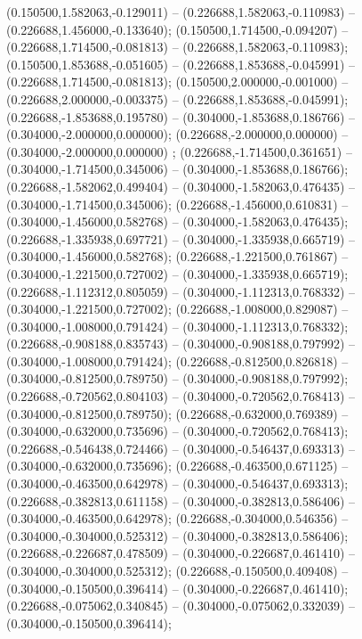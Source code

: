  (0.150500,1.582063,-0.129011) -- (0.226688,1.582063,-0.110983) -- (0.226688,1.456000,-0.133640);
 (0.150500,1.714500,-0.094207) -- (0.226688,1.714500,-0.081813) -- (0.226688,1.582063,-0.110983);
 (0.150500,1.853688,-0.051605) -- (0.226688,1.853688,-0.045991) -- (0.226688,1.714500,-0.081813);
 (0.150500,2.000000,-0.001000) -- (0.226688,2.000000,-0.003375) -- (0.226688,1.853688,-0.045991);
 (0.226688,-1.853688,0.195780) -- (0.304000,-1.853688,0.186766) -- (0.304000,-2.000000,0.000000);
 (0.226688,-2.000000,0.000000) -- (0.304000,-2.000000,0.000000) ;
 (0.226688,-1.714500,0.361651) -- (0.304000,-1.714500,0.345006) -- (0.304000,-1.853688,0.186766);
 (0.226688,-1.582062,0.499404) -- (0.304000,-1.582063,0.476435) -- (0.304000,-1.714500,0.345006);
 (0.226688,-1.456000,0.610831) -- (0.304000,-1.456000,0.582768) -- (0.304000,-1.582063,0.476435);
 (0.226688,-1.335938,0.697721) -- (0.304000,-1.335938,0.665719) -- (0.304000,-1.456000,0.582768);
 (0.226688,-1.221500,0.761867) -- (0.304000,-1.221500,0.727002) -- (0.304000,-1.335938,0.665719);
 (0.226688,-1.112312,0.805059) -- (0.304000,-1.112313,0.768332) -- (0.304000,-1.221500,0.727002);
 (0.226688,-1.008000,0.829087) -- (0.304000,-1.008000,0.791424) -- (0.304000,-1.112313,0.768332);
 (0.226688,-0.908188,0.835743) -- (0.304000,-0.908188,0.797992) -- (0.304000,-1.008000,0.791424);
 (0.226688,-0.812500,0.826818) -- (0.304000,-0.812500,0.789750) -- (0.304000,-0.908188,0.797992);
 (0.226688,-0.720562,0.804103) -- (0.304000,-0.720562,0.768413) -- (0.304000,-0.812500,0.789750);
 (0.226688,-0.632000,0.769389) -- (0.304000,-0.632000,0.735696) -- (0.304000,-0.720562,0.768413);
 (0.226688,-0.546438,0.724466) -- (0.304000,-0.546437,0.693313) -- (0.304000,-0.632000,0.735696);
 (0.226688,-0.463500,0.671125) -- (0.304000,-0.463500,0.642978) -- (0.304000,-0.546437,0.693313);
 (0.226688,-0.382813,0.611158) -- (0.304000,-0.382813,0.586406) -- (0.304000,-0.463500,0.642978);
 (0.226688,-0.304000,0.546356) -- (0.304000,-0.304000,0.525312) -- (0.304000,-0.382813,0.586406);
 (0.226688,-0.226687,0.478509) -- (0.304000,-0.226687,0.461410) -- (0.304000,-0.304000,0.525312);
 (0.226688,-0.150500,0.409408) -- (0.304000,-0.150500,0.396414) -- (0.304000,-0.226687,0.461410);
 (0.226688,-0.075062,0.340845) -- (0.304000,-0.075062,0.332039) -- (0.304000,-0.150500,0.396414);
